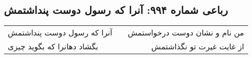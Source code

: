\begin{center}
\section*{رباعی شماره ۹۹۴: آنرا که رسول دوست پنداشتمش}
\label{sec:0994}
\begin{longtable}{l p{0.5cm} r}
آنرا که رسول دوست پنداشتمش
&&
من نام و نشان دوست درخواستمش
\\
بگشاد دهانرا که بگوید چیزی
&&
از غایت غیرت تو نگذاشتمش
\\
\end{longtable}
\end{center}

